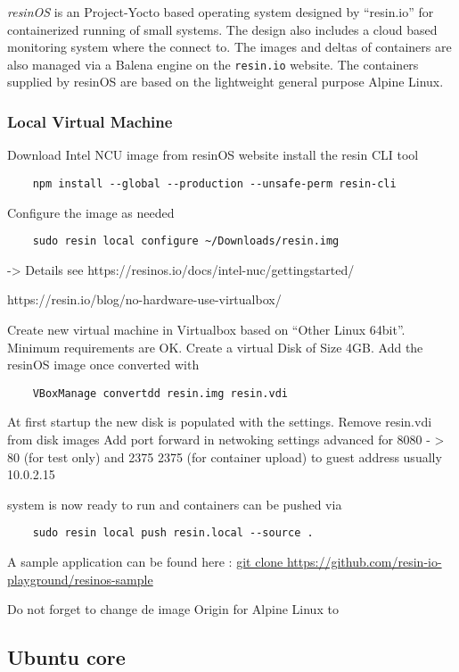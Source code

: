 \documentclass[]{scrartcl}
\begin{document}
\textit{resinOS} is an Project-Yocto based operating system designed by ``resin.io'' for containerized running of small systems. The design also includes a cloud based monitoring system where the connect to. The images and deltas of containers are also managed via a Balena engine on the \texttt{resin.io} website. The containers supplied by resinOS are based on the lightweight general purpose Alpine Linux.

\subsubsection{Local Virtual Machine}

Download Intel NCU image from resinOS website
install the resin CLI tool

\begin{verbatim}
	npm install --global --production --unsafe-perm resin-cli
\end{verbatim}
Configure the image as needed
\begin{verbatim}
	sudo resin local configure ~/Downloads/resin.img
\end{verbatim}
-> Details see https://resinos.io/docs/intel-nuc/gettingstarted/


https://resin.io/blog/no-hardware-use-virtualbox/

Create new virtual machine in Virtualbox based on ``Other Linux 64bit''. Minimum requirements are OK.
Create a virtual Disk of Size 4GB. Add the resinOS image once converted with 
\begin{verbatim}
	VBoxManage convertdd resin.img resin.vdi
\end{verbatim}
At first startup the new disk is populated with the settings. Remove resin.vdi from disk images
Add port forward in netwoking settings advanced for 8080 - > 80 (for test only) and 2375 2375 (for container upload) to guest address usually 10.0.2.15

system is now ready to run and containers can be pushed via 
\begin{verbatim}
	sudo resin local push resin.local --source .
\end{verbatim}

A sample application can be found here : \url{git clone https://github.com/resin-io-playground/resinos-sample}

Do not forget to change de image Origin for Alpine Linux to 

\subsection{Ubuntu core}
\end{document}
